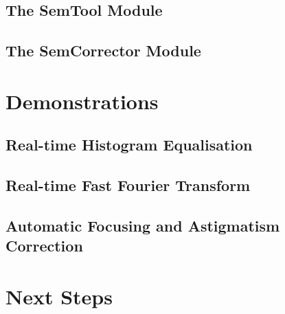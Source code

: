 \documentclass{article}
\begin{document}
\subsection{The SemTool Module}
\subsection{The SemCorrector Module}

\section{Demonstrations}
\subsection{Real-time Histogram Equalisation}
\subsection{Real-time Fast Fourier Transform}
\subsection{Automatic Focusing and Astigmatism Correction}

\section{Next Steps}

\newpage
\begin{thebibliography}{}
\end{thebibliography}
\end{document}
